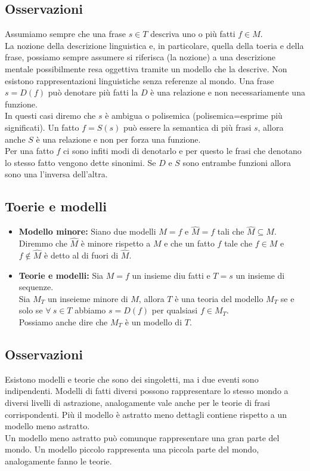 \documentclass{book}
\newcommand{\spazio}{\vspace{1em} \newline}
\begin{document}
    \subsection{Osservazioni}
    Assumiamo sempre che una frase $s \in T$ descriva uno o più fatti $f \in M$.\\
    La nozione della descrizione linguistica e, in particolare, quella della toeria e della frase, possiamo sempre assumere si riferisca (la nozione) a una descrizione mentale possibilmente resa oggettiva tramite un modello che la descrive.
    \spazio
    Non esistono rappresentazioni linguistiche senza referenze al mondo.
    \spazio
    Una frase $s=D(f)$ può denotare più fatti la $D$ è una relazione e non necessariamente una funzione.\\
    In questi casi diremo che $s$ è ambigua o polisemica (polisemica=esprime più significati).
    \spazio
    Un fatto $f=S(s)$ può essere la semantica di più frasi $s$, allora anche $S$ è una relazione e non per forza una funzione.\\
    Per una fatto $f$ ci sono infiti modi di denotarlo e per questo le frasi che denotano lo stesso fatto vengono dette sinonimi.
    \spazio
    Se $D$ e $S$ sono entrambe funzioni allora sono una l'inversa dell'altra.

    \subsection{Toerie e modelli}
    \begin{itemize}
        \item \textbf{Modello minore:} Siano due modelli $M={f}$ e $\widehat{M}={f}$ tali che $\widehat{M}\subseteq M$.\\
            Diremmo che $\widehat{M}$ è minore rispetto a $M$ e che un fatto $f$ tale che $f \in M$ e $f \notin \widehat{M}$ è detto al di fuori di $\widehat{M}$.
        \item \textbf{Teorie e modelli:} Sia $M={f}$ un insieme diu fatti e $T={s}$ un insieme di sequenze.\\
            Sia $M_T$ un inseieme minore di $M$, allora $T$ è una teoria del modello $M_T$ se e solo se $\forall\ s\in T$ abbiamo $s=D(f) $ per qualsiasi $f \in M_T$.\\
            Possiamo anche dire che $M_T$ è un modello di $T$. 
    \end{itemize}

    \subsection{Osservazioni}
    Esistono modelli e teorie che sono dei singoletti, ma i due eventi sono indipendenti.
    \spazio
    Modelli di fatti diversi possono rappresentare lo stesso mondo a diversi livelli di astrazione, analogamente vale anche per le teorie di frasi corrispondenti.
    \spazio
    Più il modello è astratto meno dettagli contiene rispetto a un modello meno astratto.\\
    Un modello meno astratto può comunque rappresentare una gran parte del mondo.
    \spazio
    Un modello piccolo rappresenta una piccola parte del mondo, analogamente fanno le teorie.
\end{document}
